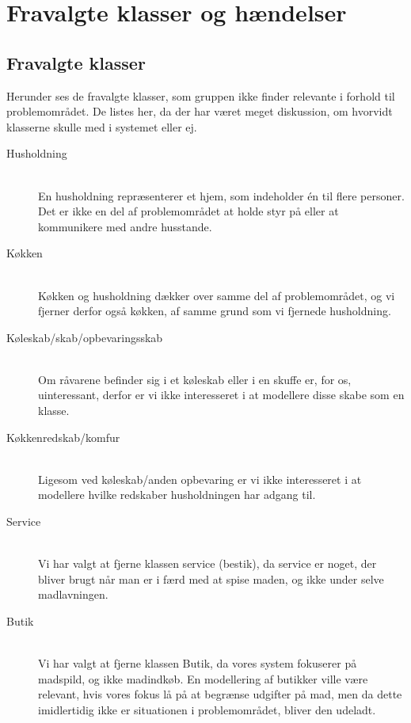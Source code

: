 \chapter{Fravalgte klasser og hændelser}
\label{ap:fravalgteklasseroghaendelser}

\section{Fravalgte klasser}
\label{ap:fravalgteklasser}
Herunder ses de fravalgte klasser, som gruppen ikke finder relevante i forhold til problemområdet. De listes her, da der har været meget diskussion, om hvorvidt klasserne skulle med i systemet eller ej. 

\begin{description}
\item[Husholdning] \hfill \\
En husholdning repræsenterer et hjem, som indeholder én til flere personer. Det er ikke en del af problemområdet at holde styr på eller at kommunikere med andre husstande.

\item[Køkken] \hfill \\
Køkken og husholdning dækker over samme del af problemområdet, og vi fjerner derfor også køkken, af samme grund som vi fjernede husholdning.

\item[Køleskab/skab/opbevaringsskab] \hfill \\
Om råvarene befinder sig i et køleskab eller i en skuffe er, for os, uinteressant, derfor er vi ikke interesseret i at modellere disse skabe som en klasse.

\item[Køkkenredskab/komfur] \hfill \\
Ligesom ved køleskab/anden opbevaring er vi ikke interesseret i at modellere hvilke redskaber husholdningen har adgang til.

\item[Service] \hfill \\ 
Vi har valgt at fjerne klassen service (bestik), da service er noget, der bliver brugt når man er i færd med at spise maden, og ikke under selve madlavningen.

\item[Butik] \hfill \\
Vi har valgt at fjerne klassen Butik, da vores system fokuserer på madspild, og ikke madindkøb. En modellering af butikker ville være relevant, hvis vores fokus lå på at begrænse udgifter på mad, men da dette imidlertidig ikke er situationen i problemområdet, bliver den udeladt.


\end{description}
